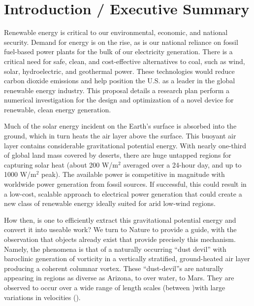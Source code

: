 \section{Introduction / Executive Summary}

Renewable energy is critical to our environmental, economic, and
national security. Demand for energy is on the rise, as is our national
reliance on fossil fuel-based power plants for the bulk of our
electricity generation. There is a critical need for safe, clean, and
cost-effective alternatives to coal, such as wind, solar, hydroelectric,
and geothermal power\cite{arpa-e}. These technologies would reduce carbon dioxide
emissions and help position the U.S. as a leader in the global renewable
energy industry. 
%
%
This proposal details a research plan perform a numerical investigation
for the design and optimization of a novel device for renewable, clean
energy generation. 

Much of the solar energy incident on the Earth's surface is absorbed
into the ground, which in turn heats the air layer above the surface.
This buoyant air layer contains considerable gravitational potential
energy. 
With nearly one-third of global land mass covered by deserts, there are huge
untapped regions for capturing solar heat (about 200 W/$\text{m}^2$ averaged over
a 24-hour day, and up to 1000 W/$\text{m}^2$ peak)\cite{something}.  The
available power is competitive in magnitude with worldwide power
generation from fossil sources. If successful, this could result in a
low-cost, scalable approach to electrical power generation that could
create a new class of renewable energy ideally suited for arid low-wind regions. 

How then, is one to efficiently extract this gravitational potential
energy and convert it into useable work? We turn to Nature to provide a 
guide, with the observation that objects already
exist that provide precisely this mechanism. Namely, the phenomena is
that of a naturally 
%
%
occurring ``dust devil'' with baroclinic generation of vorticity in a
vertically stratified, ground-heated air layer producing a coherent
columnar vortex. These ``dust-devil''s are naturally appearing in
regions as diverse as Arizona, to over water, to Mars\cite{mars}. They
are observed to occur over a wide range of length scales (between )with
large variations in 
velocities ()\cite{sinclair}. 

